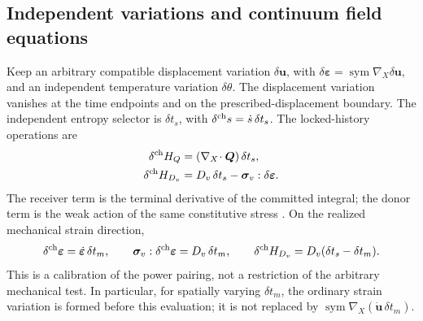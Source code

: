 \documentclass[11pt,a4paper]{article}
\theoremstyle{remark}\newtheorem{remark}{Remark}
\numberwithin{equation}{section}
\newcommand{\grad}{\nabla}
\newcommand{\sym}{\operatorname{sym}}
\begin{document}
\subsection{Independent variations and continuum field equations}
Keep an arbitrary compatible displacement variation $\delta\boldsymbol u$, with
$\delta\boldsymbol\varepsilon=\sym\grad_X\delta\boldsymbol u$, and an independent temperature variation $\delta\theta$. The displacement variation vanishes at the time endpoints and on the prescribed-displacement boundary. The independent entropy selector is $\delta t_s$, with $\delta^{\rm ch}s=\dot s\,\delta t_s$. The locked-history operations are
\begin{equation}
\begin{aligned}
\delta^{\rm ch}H_Q&=(\grad_X\!\cdot\boldsymbol Q)\,\delta t_s,\\
\delta^{\rm ch}H_{D_v}
&=D_v\,\delta t_s-\boldsymbol\sigma_v:\delta\boldsymbol\varepsilon.
\end{aligned}
\label{eq:reviewrules}
\end{equation}
The receiver term is the terminal derivative of the committed integral; the donor term is the weak action of the same constitutive stress \citep{RenSpending,RenMultiChannel}. On the realized mechanical strain direction,
\begin{equation}
\delta^{\rm ch}\boldsymbol\varepsilon
=\dot{\boldsymbol\varepsilon}\,\delta t_m,
\qquad
\boldsymbol\sigma_v:\delta^{\rm ch}\boldsymbol\varepsilon
=D_v\,\delta t_m,
\qquad
\delta^{\rm ch}H_{D_v}=D_v(\delta t_s-\delta t_m).
\label{eq:reviewcalibration}
\end{equation}
This is a calibration of the power pairing, not a restriction of the arbitrary mechanical test. In particular, for spatially varying $\delta t_m$, the ordinary strain variation is formed before this evaluation; it is not replaced by $\sym\grad_X(\dot{\boldsymbol u}\,\delta t_m)$.
\end{document}
